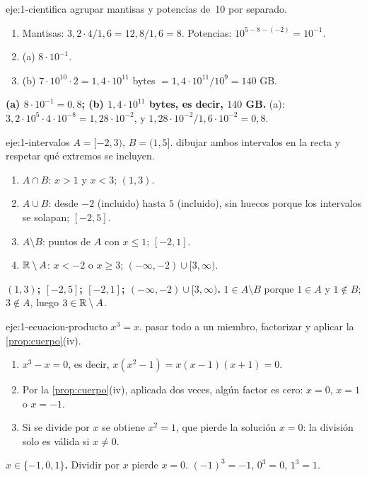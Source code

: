\begin{solucion}{eje:1-cientifica}
\planteamiento agrupar mantisas y potencias de~10 por separado.
\pasos
\begin{enumerate}[label=\arabic*.]
  \item Mantisas: $3{,}2\cdot4/1{,}6=12{,}8/1{,}6=8$. Potencias: $10^{5-8-(-2)}=10^{-1}$.
  \item (a) $8\cdot10^{-1}$.
  \item (b) $7\cdot10^{10}\cdot2=1{,}4\cdot10^{11}$ bytes $=1{,}4\cdot10^{11}/10^9=140$ GB.
\end{enumerate}
\resultado \textbf{(a) $8\cdot10^{-1}=0{,}8$; (b) $1{,}4\cdot10^{11}$ bytes, es decir, $140$ GB.}
\comprobacion (a): $3{,}2\cdot10^5\cdot4\cdot10^{-8}=1{,}28\cdot10^{-2}$, y $1{,}28\cdot10^{-2}/1{,}6\cdot10^{-2}=0{,}8$.
\end{solucion}

\begin{solucion}{eje:1-intervalos}
\datos $A=[-2,3)$, $B=(1,5]$.
\planteamiento dibujar ambos intervalos en la recta y respetar qué extremos se incluyen.
\pasos
\begin{enumerate}[label=\arabic*.]
  \item $A\cap B$: $x>1$ y $x<3$; $(1,3)$.
  \item $A\cup B$: desde $-2$ (incluido) hasta $5$ (incluido), sin huecos porque los intervalos se solapan; $[-2,5]$.
  \item $A\setminus B$: puntos de $A$ con $x\le1$; $[-2,1]$.
  \item $\mathbb{R}\setminus A$: $x<-2$ o $x\ge3$; $(-\infty,-2)\cup[3,\infty)$.
\end{enumerate}
\resultado \textbf{$(1,3)$; $[-2,5]$; $[-2,1]$; $(-\infty,-2)\cup[3,\infty)$.}
\comprobacion $1\in A\setminus B$ porque $1\in A$ y $1\notin B$; $3\notin A$, luego $3\in\mathbb{R}\setminus A$.
\end{solucion}

\begin{solucion}{eje:1-ecuacion-producto}
\datos $x^3=x$.
\planteamiento pasar todo a un miembro, factorizar y aplicar la \cref{prop:cuerpo}(iv).
\pasos
\begin{enumerate}[label=\arabic*.]
  \item $x^3-x=0$, es decir, $x(x^2-1)=x(x-1)(x+1)=0$.
  \item Por la \cref{prop:cuerpo}(iv), aplicada dos veces, algún factor es cero: $x=0$, $x=1$ o $x=-1$.
  \item Si se divide por $x$ se obtiene $x^2=1$, que pierde la solución $x=0$: la división solo es válida si $x\neq0$.
\end{enumerate}
\resultado \textbf{$x\in\{-1,0,1\}$.} Dividir por $x$ pierde $x=0$.
\comprobacion $(-1)^3=-1$, $0^3=0$, $1^3=1$.
\end{solucion}

